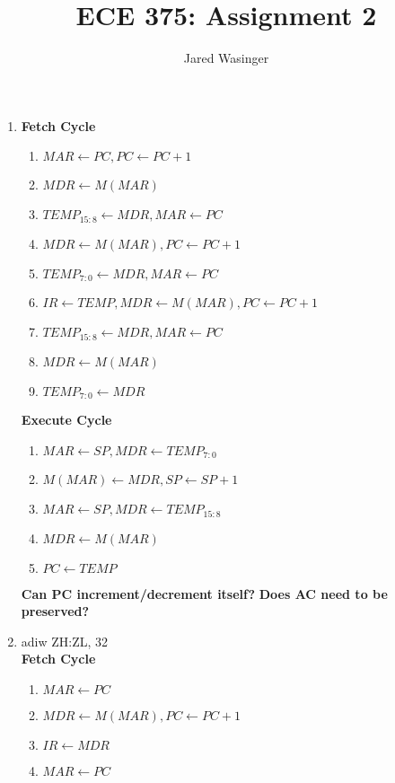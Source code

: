 \documentclass{article}
\begin{document}
  \title{ECE 375: Assignment 2}
  \author{Jared Wasinger}

  \maketitle

  \begin{enumerate}
    \item \textbf{Fetch Cycle} \begin{enumerate}
      \item $MAR \leftarrow PC, PC \leftarrow PC + 1$
      \item $MDR \leftarrow M(MAR)$
      \item $TEMP_{15:8} \leftarrow MDR, MAR \leftarrow PC$
      \item $MDR \leftarrow M(MAR), PC \leftarrow PC + 1$
      \item $TEMP_{7:0} \leftarrow MDR, MAR \leftarrow PC$
      \item $IR \leftarrow TEMP, MDR \leftarrow M(MAR), PC \leftarrow PC + 1$
      \item $TEMP_{15:8} \leftarrow MDR, MAR \leftarrow PC$
      \item $MDR \leftarrow M(MAR)$
      \item $TEMP_{7:0} \leftarrow MDR$
      \end{enumerate}
    \textbf{Execute Cycle} \begin{enumerate}
      \item $MAR \leftarrow SP, MDR \leftarrow TEMP_{7:0}$
      \item $M(MAR) \leftarrow MDR, SP \leftarrow SP + 1$
      \item $MAR \leftarrow SP, MDR \leftarrow TEMP_{15:8}$
      \item $MDR \leftarrow M(MAR)$
      \item $PC \leftarrow TEMP$
      \end{enumerate}
      \textbf{Can PC increment/decrement itself?}
      \textbf{Does AC need to be preserved?}
    \item adiw ZH:ZL, 32\\
      \textbf{Fetch Cycle}\begin{enumerate}
        \item $MAR \leftarrow PC$
        \item $MDR \leftarrow M(MAR), PC \leftarrow PC + 1$ 
        \item $IR \leftarrow MDR$
        \item $MAR \leftarrow PC$

\end{enumerate}
\end{enumerate}
\end{document}
